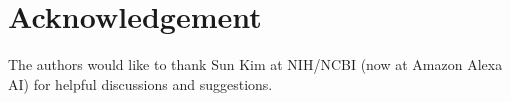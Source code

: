\documentclass[11pt,a4paper]{article}
\begin{document}
\section*{Acknowledgement}
The authors would like to thank Sun Kim at NIH/NCBI (now at Amazon Alexa AI) for helpful discussions and suggestions.
\end{document}
